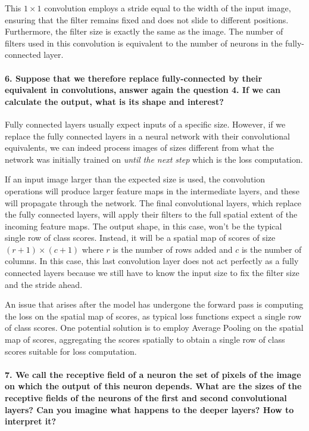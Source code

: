 This $1 \times 1$ convolution employs a stride equal to the width of the input image, ensuring that the filter remains fixed and does not slide to different positions. Furthermore, the filter size is exactly the same as the image. The number of filters used in this convolution is equivalent to the number of neurons in the fully-connected layer.

\paragraph{6. Suppose that we therefore replace fully-connected by their equivalent in convolutions, answer again the question 4. If we can calculate the output, what is its shape and interest?}
Fully connected layers usually expect inputs of a specific size. However, if we replace the fully connected layers in a neural network with their convolutional equivalents, we can indeed process images of sizes different from what the network was initially trained on \textit{until the next step} which is the loss computation. 

If an input image larger than the expected size is used, the convolution operations will produce larger feature maps in the intermediate layers, and these will propagate through the network. The final convolutional layers, which replace the fully connected layers, will apply their filters to the full spatial extent of the incoming feature maps. The output shape, in this case, won't be the typical single row of class scores. Instead, it will be a spatial map of scores of size $ (r + 1) \times (c+1) $ where $ r $ is the number of rows added and $ c $ is the number of columns. In this case, this last convolution layer does not act perfectly as a fully connected layers because we still have to know the input size to fix the filter size and the stride ahead.

An issue that arises after the model has undergone the forward pass is computing the loss on the spatial map of scores, as typical loss functions expect a single row of class scores. One potential solution is to employ Average Pooling on the spatial map of scores, aggregating the scores spatially to obtain a single row of class scores suitable for loss computation.

\paragraph{7. We call the receptive field of a neuron the set of pixels of the image on which the output of this neuron depends. What are the sizes of the receptive fields of the neurons of the first and second convolutional layers? Can you imagine what happens to the deeper layers? How to interpret it?}

